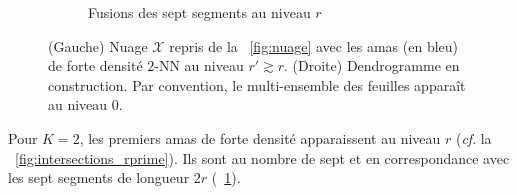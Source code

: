 \begin{figure}[htbp]
\begin{subfigure}[b]{0.53\textwidth}
        \caption{Fusions des sept segments au niveau $r$}
        \label{fig:foret_dendrogrammes}
    \end{subfigure}
    
    \caption{(Gauche) Nuage $\mathcal X$ repris de la \Fig~\ref{fig:nuage} avec les amas (en bleu) de forte densité $2$-NN au niveau $r' \gtrsim r$. (Droite) Dendrogramme en construction. Par convention, le multi-ensemble des feuilles apparaît au niveau $0$.}
    \label{fig:complexe_rprime}
\end{figure}


Pour $K=2$, les premiers amas de forte densité apparaissent au niveau $r$ (\emph{cf}. la \Fig~\ref{fig:intersections_rprime}). Ils sont au nombre de sept et en correspondance avec les sept segments de longueur $2r$ (\Fig~\ref{fig:foret_dendrogrammes}).


